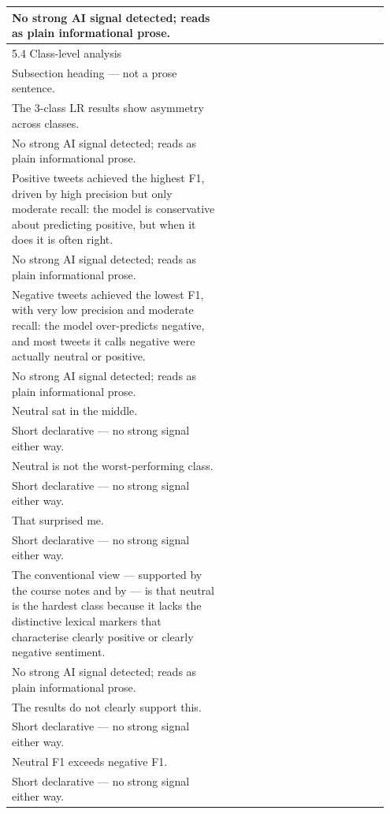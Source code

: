 \documentclass[11pt]{article}
\begin{document}
\begin{longtable}{|p{0.55\linewidth}|p{0.40\linewidth}|}
\hline
No strong AI signal detected; reads as plain informational prose. & \\
\hline
5.4 Class-level analysis & \\[2pt]
\hline
Subsection heading --- not a prose sentence. & \\
\hline
The 3-class LR results show asymmetry across classes. & \\[2pt]
\hline
No strong AI signal detected; reads as plain informational prose. & \\
\hline
Positive tweets achieved the highest F1, driven by high precision but only moderate recall: the model is conservative about predicting positive, but when it does it is often right. & \\[2pt]
\hline
No strong AI signal detected; reads as plain informational prose. & \\
\hline
Negative tweets achieved the lowest F1, with very low precision and moderate recall: the model over-predicts negative, and most tweets it calls negative were actually neutral or positive. & \\[2pt]
\hline
No strong AI signal detected; reads as plain informational prose. & \\
\hline
Neutral sat in the middle. & \\[2pt]
\hline
Short declarative --- no strong signal either way. & \\
\hline
Neutral is not the worst-performing class. & \\[2pt]
\hline
Short declarative --- no strong signal either way. & \\
\hline
That surprised me. & \\[2pt]
\hline
Short declarative --- no strong signal either way. & \\
\hline
The conventional view --- supported by the course notes and by --- is that neutral is the hardest class because it lacks the distinctive lexical markers that characterise clearly positive or clearly negative sentiment. & \\[2pt]
\hline
No strong AI signal detected; reads as plain informational prose. & \\
\hline
The results do not clearly support this. & \\[2pt]
\hline
Short declarative --- no strong signal either way. & \\
\hline
Neutral F1 exceeds negative F1. & \\[2pt]
\hline
Short declarative --- no strong signal either way. & \\

\end{longtable}
\end{document}
